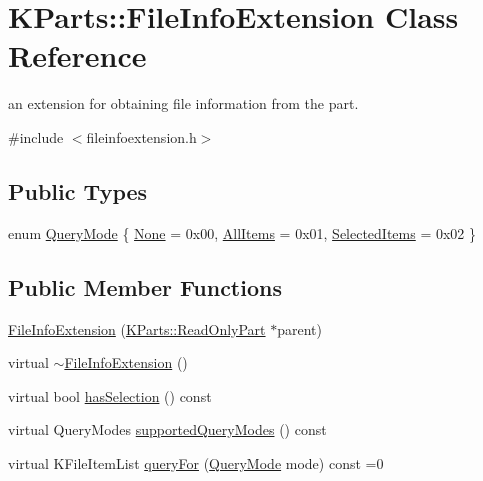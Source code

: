 \hypertarget{classKParts_1_1FileInfoExtension}{\section{\-K\-Parts\-:\-:\-File\-Info\-Extension \-Class \-Reference}
\label{classKParts_1_1FileInfoExtension}
}


an extension for obtaining file information from the part.  




{\ttfamily \#include $<$fileinfoextension.\-h$>$}

\subsection*{\-Public \-Types}
\begin{DoxyCompactItemize}
\item 
enum \hyperlink{classKParts_1_1FileInfoExtension_a9bc830a53b0005013082984a2bbd5639}{\-Query\-Mode} \{ \hyperlink{classKParts_1_1FileInfoExtension_a9bc830a53b0005013082984a2bbd5639af7f7b524610ed47f67081fee1a37a604}{\-None} =  0x00, 
\hyperlink{classKParts_1_1FileInfoExtension_a9bc830a53b0005013082984a2bbd5639a553b2481b4b7b99d8f839eed303177d8}{\-All\-Items} =  0x01, 
\hyperlink{classKParts_1_1FileInfoExtension_a9bc830a53b0005013082984a2bbd5639aaa07fd2649d0deb94a819b29cddbe32e}{\-Selected\-Items} =  0x02
 \}
\end{DoxyCompactItemize}
\subsection*{\-Public \-Member \-Functions}
\begin{DoxyCompactItemize}
\item 
\hyperlink{classKParts_1_1FileInfoExtension_ab7f24a4cbfcabe40422b26fa2ee562b7}{\-File\-Info\-Extension} (\hyperlink{classKParts_1_1ReadOnlyPart}{\-K\-Parts\-::\-Read\-Only\-Part} $\ast$parent)
\item 
virtual \hyperlink{classKParts_1_1FileInfoExtension_aefda4c72d82131c2dd8cc2e69d157a90}{$\sim$\-File\-Info\-Extension} ()
\item 
virtual bool \hyperlink{classKParts_1_1FileInfoExtension_a4774dbd7c4debae026e6103ba0b4ffd5}{has\-Selection} () const 
\item 
virtual \-Query\-Modes \hyperlink{classKParts_1_1FileInfoExtension_aa07ffdbb4c8ecc67d75836d48cb33250}{supported\-Query\-Modes} () const 
\item 
virtual \-K\-File\-Item\-List \hyperlink{classKParts_1_1FileInfoExtension_addac1579dcbc21c5fcceecda6f5cb532}{query\-For} (\hyperlink{classKParts_1_1FileInfoExtension_a9bc830a53b0005013082984a2bbd5639}{\-Query\-Mode} mode) const =0
\end{DoxyCompactItemize}
